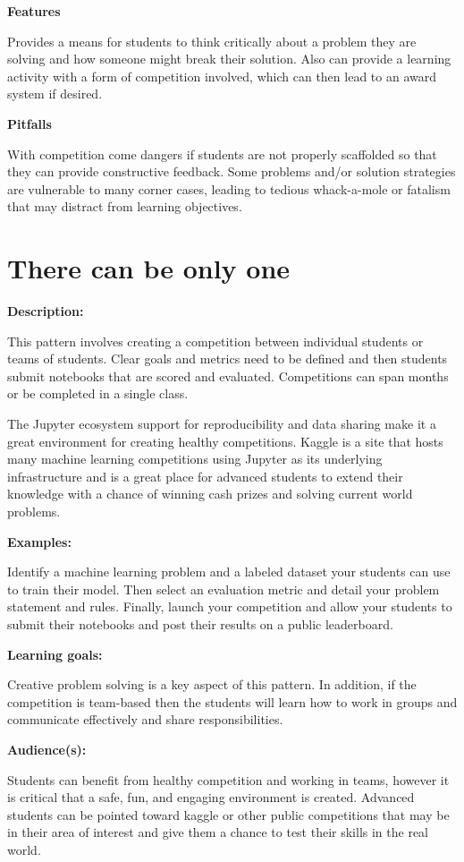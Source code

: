 \documentclass[]{book}
\begin{document}
\textbf{Features}

Provides a means for students to think critically about a problem they
are solving and how someone might break their solution. Also can provide
a learning activity with a form of competition involved, which can then
lead to an award system if desired.

\textbf{Pitfalls}

With competition come dangers if students are not properly scaffolded so
that they can provide constructive feedback. Some problems and/or
solution strategies are vulnerable to many corner cases, leading to
tedious whack-a-mole or fatalism that may distract from learning
objectives.

\section{There can be only one}\label{there-can-be-only-one}

\textbf{Description:}

This pattern involves creating a competition between individual students
or teams of students. Clear goals and metrics need to be defined and
then students submit notebooks that are scored and evaluated.
Competitions can span months or be completed in a single class.

The Jupyter ecosystem support for reproducibility and data sharing make
it a great environment for creating healthy competitions. Kaggle is a
site that hosts many machine learning competitions using Jupyter as its
underlying infrastructure and is a great place for advanced students to
extend their knowledge with a chance of winning cash prizes and solving
current world problems.

\textbf{Examples:}

Identify a machine learning problem and a labeled dataset your students
can use to train their model. Then select an evaluation metric and
detail your problem statement and rules. Finally, launch your
competition and allow your students to submit their notebooks and post
their results on a public leaderboard.

\textbf{Learning goals:}

Creative problem solving is a key aspect of this pattern. In addition,
if the competition is team-based then the students will learn how to
work in groups and communicate effectively and share responsibilities.

\textbf{Audience(s):}

Students can benefit from healthy competition and working in teams,
however it is critical that a safe, fun, and engaging environment is
created. Advanced students can be pointed toward kaggle or other public
competitions that may be in their area of interest and give them a
chance to test their skills in the real world.
\end{document}
